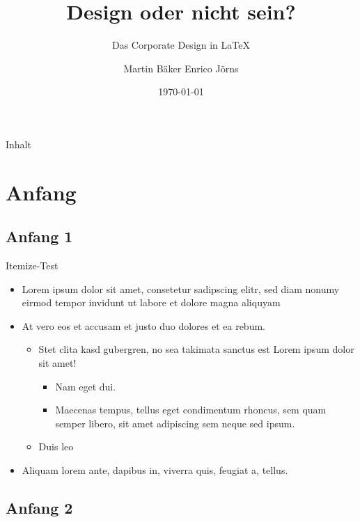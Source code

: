 \documentclass[11pt,cmyk,a4paper,colorscheme=green,TUBStitlepage=picture]{tubsartcl}
\date{\today}
\title{Design oder nicht sein?}
\subtitle{Das Corporate Design in  LaTeX}
\author{Martin Bäker  Enrico Jörns}
\institute{asdf}
\begin{document}
\maketitle

\begin{frame}[plain]
\titlepage
\end{frame}

\begin{frame}{Inhalt}
\tableofcontents
\end{frame}

\section{Anfang}

\subsection{Anfang 1}

\begin{frame}{Itemize-Test}
  \begin{itemize}
    \item Lorem ipsum dolor sit amet, consetetur sadipscing elitr, sed diam
      nonumy eirmod tempor invidunt ut labore et dolore magna aliquyam
    \item At vero eos et accusam et justo duo dolores et ea rebum.
      \begin{itemize}
        \item Stet clita kasd gubergren, no sea takimata sanctus est Lorem ipsum
          dolor sit amet!
          \begin{itemize}
            \item Nam eget dui.
            \item Maecenas tempus, tellus eget condimentum rhoncus, sem quam
              semper libero, sit amet adipiscing sem neque sed ipsum.
          \end{itemize}
        \item Duis leo
      \end{itemize}
    \item Aliquam lorem ante, dapibus in, viverra quis, feugiat a, tellus. 
  \end{itemize}
\end{frame}

\subsection{Anfang 2}
\end{document}
